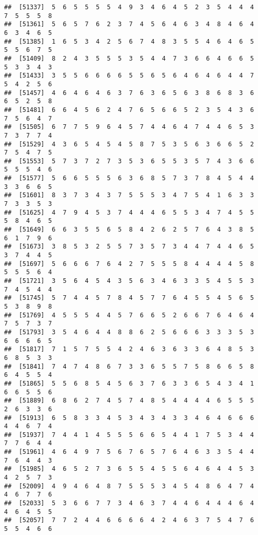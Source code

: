 \documentclass[
]{book}
\begin{document}
\begin{verbatim}
##  [51337]  5  6  5  5  5  5  4  9  3  4  6  4  5  2  3  5  4  4  4  7  5  5  5  8
##  [51361]  5  6  5  7  6  2  3  7  4  5  6  4  6  3  4  8  4  6  4  6  3  4  6  5
##  [51385]  1  6  5  3  4  2  5  6  7  4  8  3  5  5  4  6  4  6  5  5  5  6  7  5
##  [51409]  8  2  4  3  5  5  5  3  5  4  4  7  3  6  6  4  6  6  5  5  3  3  4  3
##  [51433]  3  5  5  6  6  6  6  5  5  6  5  6  4  6  4  6  4  4  7  5  4  2  5  6
##  [51457]  4  6  4  6  4  6  3  7  6  3  6  5  6  3  8  6  8  3  6  6  5  2  5  8
##  [51481]  6  6  4  5  6  2  4  7  6  5  6  6  5  2  3  5  4  3  6  7  5  6  4  7
##  [51505]  6  7  7  5  9  6  4  5  7  4  4  6  4  7  4  4  6  5  3  7  3  7  7  4
##  [51529]  4  3  6  5  4  5  4  5  8  7  5  3  5  6  3  6  6  5  2  7  5  4  7  5
##  [51553]  5  7  3  7  2  7  3  5  3  6  5  5  3  5  7  4  3  6  6  5  5  5  4  6
##  [51577]  5  6  6  5  5  5  6  3  6  8  5  7  3  7  8  4  5  4  4  3  3  6  6  5
##  [51601]  8  3  7  3  4  3  7  5  5  5  3  4  7  5  4  1  6  3  3  7  3  3  5  3
##  [51625]  4  7  9  4  5  3  7  4  4  4  6  5  5  3  4  7  4  5  5  5  8  4  6  5
##  [51649]  6  6  3  5  5  6  5  8  4  2  6  2  5  7  6  4  3  8  5  6  1  7  9  6
##  [51673]  3  8  5  3  2  5  5  7  3  5  7  3  4  4  7  4  4  6  5  3  7  4  4  5
##  [51697]  5  6  6  6  7  6  4  2  7  5  5  5  8  4  4  4  4  5  8  5  5  5  6  4
##  [51721]  3  5  6  4  5  4  3  5  6  3  4  6  3  3  5  4  5  5  3  7  4  5  4  4
##  [51745]  5  7  4  4  5  7  8  4  5  7  7  6  4  5  5  4  5  6  5  5  3  8  9  8
##  [51769]  4  5  5  5  4  4  5  7  6  6  5  2  6  6  7  6  4  6  4  7  5  7  3  7
##  [51793]  3  5  4  6  4  4  8  8  6  2  5  6  6  6  3  3  3  5  3  6  6  6  6  5
##  [51817]  7  1  5  7  5  5  4  2  4  6  3  6  3  3  6  4  8  5  3  6  8  5  3  3
##  [51841]  7  4  7  4  8  6  7  3  3  6  5  5  7  5  8  6  6  5  8  6  4  5  5  4
##  [51865]  5  5  6  8  5  4  5  6  3  7  6  3  3  6  5  4  3  4  1  6  6  5  5  6
##  [51889]  6  8  6  2  7  4  5  7  4  8  5  4  4  4  4  6  5  5  5  2  6  3  3  6
##  [51913]  6  5  8  3  3  4  5  3  4  3  4  3  3  4  6  4  6  6  6  4  4  6  7  4
##  [51937]  7  4  4  1  4  5  5  5  6  6  5  4  4  1  7  5  3  4  4  7  7  6  4  4
##  [51961]  4  6  4  9  7  5  6  7  6  5  7  6  4  6  3  3  5  4  4  7  6  4  4  3
##  [51985]  4  6  5  2  7  3  6  5  5  4  5  5  6  4  6  4  4  5  3  4  2  5  7  3
##  [52009]  4  9  4  6  4  8  7  5  5  5  3  4  5  4  8  6  4  7  4  4  6  7  7  6
##  [52033]  5  3  6  6  7  7  3  4  6  3  7  4  4  6  4  4  4  6  4  4  6  4  5  5
##  [52057]  7  7  2  4  4  6  6  6  6  4  2  4  6  3  7  5  4  7  6  5  5  4  6  6

\end{verbatim}
\end{document}
